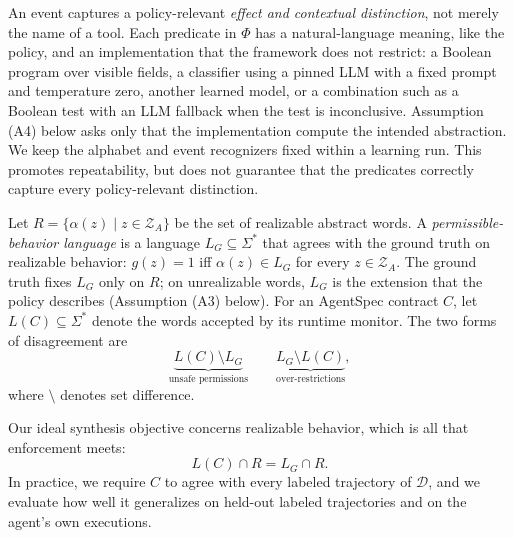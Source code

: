 An event captures a policy-relevant \emph{effect and contextual distinction}, not merely the name of a tool. Each predicate in $\Phi$ has a natural-language meaning, like the policy, and an implementation that the framework does not restrict: a Boolean program over visible fields, a classifier using a pinned LLM with a fixed prompt and temperature zero, another learned model, or a combination such as a Boolean test with an LLM fallback when the test is inconclusive. Assumption (A4) below asks only that the implementation compute the intended abstraction. We keep the alphabet and event recognizers fixed within a learning run. This promotes repeatability, but does not guarantee that the predicates correctly capture every policy-relevant distinction.

\begin{definition}\label{def:policy-language}
Let $R=\{\alpha(z)\mid z\in\mathcal{Z}_A\}$ be the set of realizable abstract words. A \emph{permissible-behavior language} is a language $L_G\subseteq\Sigma^*$ that agrees with the ground truth on realizable behavior: $g(z)=1$ iff $\alpha(z)\in L_G$ for every $z\in\mathcal{Z}_A$. The ground truth fixes $L_G$ only on $R$; on unrealizable words, $L_G$ is the extension that the policy describes (Assumption (A3) below). For an AgentSpec contract $C$, let $L(C)\subseteq\Sigma^*$ denote the words accepted by its runtime monitor. The two forms of disagreement are
\[
 \underbrace{L(C)\setminus L_G}_{\text{unsafe permissions}}
 \qquad
 \underbrace{L_G\setminus L(C)}_{\text{over-restrictions}},
\]
where $\setminus$ denotes set difference.
\end{definition}

Our ideal synthesis objective concerns realizable behavior, which is all that enforcement meets:
\[
  L(C)\cap R=L_G\cap R .
\]
In practice, we require $C$ to agree with every labeled trajectory of $\mathcal{D}$, and we evaluate how well it generalizes on held-out labeled trajectories and on the agent's own executions.

